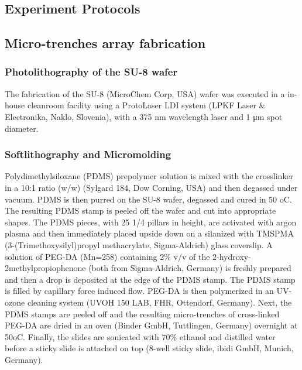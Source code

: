 \documentclass[pdftex,12pt,a4paper]{report}
\begin{document}
\begin{appendices}

\chapter{Experiment Protocols}

\section{Micro-trenches array fabrication} \label{appendix:microtrench}

\subsection*{Photolithography of the SU-8 wafer}

The fabrication of the SU-8 (MicroChem Corp, USA) wafer was executed in a in-house cleanroom facility using a ProtoLaser LDI system (LPKF Laser \& Electronika, Naklo, Slovenia), with a 375 nm wavelength laser and 1 μm spot diameter.

\subsection*{Softlithography and Micromolding}

Polydimethylsiloxane (PDMS) prepolymer solution is mixed with the crosslinker in a 10:1 ratio (w/w) (Sylgard 184, Dow Corning, USA) and then degassed under vacuum. PDMS is then purred on the SU-8 wafer, degassed and cured in 50 oC. The resulting PDMS stamp is peeled off the wafer and cut into appropriate shapes. The PDMS pieces, with 25 1/4 pillars in height, are activated with argon plasma and then immediately placed upside down on a silanized with TMSPMA (3-(Trimethoxysilyl)propyl methacrylate, Sigma-Aldrich) glass coverslip. A solution of PEG-DA (Mn=258) containing 2\% v/v of the 2-hydroxy-2methylpropiophenone (both from Sigma-Aldrich, Germany) is freshly prepared and then a drop is deposited at the edge of the PDMS stamp. The PDMS stamp is filled by capillary force induced flow. PEG-DA is then polymerized in an UV-ozone cleaning system (UVOH 150 LAB, FHR, Ottendorf, Germany). Next, the PDMS stamps are peeled off and the resulting micro-trenches of cross-linked PEG-DA are dried in an oven (Binder GmbH, Tuttlingen, Germany) overnight at 50oC. Finally, the slides are sonicated with 70\% ethanol and distilled water before a sticky slide is attached on top (8-well sticky slide, ibidi GmbH, Munich, Germany).


\end{appendices}
\end{document}
